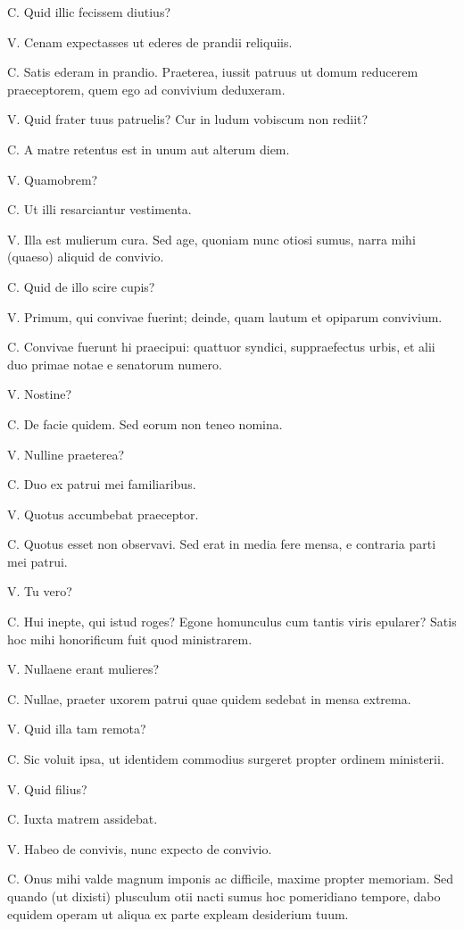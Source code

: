 \documentclass{article}
\begin{document}
C. Quid illic fecissem diutius?

V. Cenam expectasses ut ederes de prandii reliquiis.

C. Satis ederam in prandio. Praeterea, iussit patruus ut domum reducerem praeceptorem, quem ego ad convivium deduxeram.

V. Quid frater tuus patruelis? Cur in ludum vobiscum non rediit?

C. A matre retentus est in unum aut alterum diem.

V. Quamobrem?

C. Ut illi resarciantur vestimenta.

V. Illa est mulierum cura. Sed age, quoniam nunc otiosi sumus, narra mihi (quaeso) aliquid de convivio.

C. Quid de illo scire cupis?

V. Primum, qui convivae fuerint; deinde, quam lautum et opiparum convivium.

C. Convivae fuerunt hi praecipui: quattuor syndici, suppraefectus urbis, et alii duo primae notae e senatorum numero.

V. Nostine?

C. De facie quidem. Sed eorum non teneo nomina.

V. Nulline praeterea?

C. Duo ex patrui mei familiaribus.

V. Quotus accumbebat praeceptor.
 
C. Quotus esset non observavi. Sed erat in media fere mensa, e contraria parti mei patrui.

V. Tu vero?

C. Hui inepte, qui istud roges? Egone homunculus cum tantis viris epularer? Satis hoc mihi honorificum fuit quod ministrarem.

V. Nullaene erant mulieres?

C. Nullae, praeter uxorem patrui quae quidem sedebat in mensa extrema.

V. Quid illa tam remota?

C. Sic voluit ipsa, ut identidem commodius surgeret propter ordinem ministerii.

V. Quid filius?

C. Iuxta matrem assidebat.

V. Habeo de convivis, nunc expecto de convivio.

C. Onus mihi valde magnum imponis ac difficile, maxime propter memoriam. Sed quando (ut dixisti) plusculum otii nacti sumus hoc pomeridiano tempore, dabo equidem operam ut aliqua ex parte expleam desiderium tuum.
\end{document}

